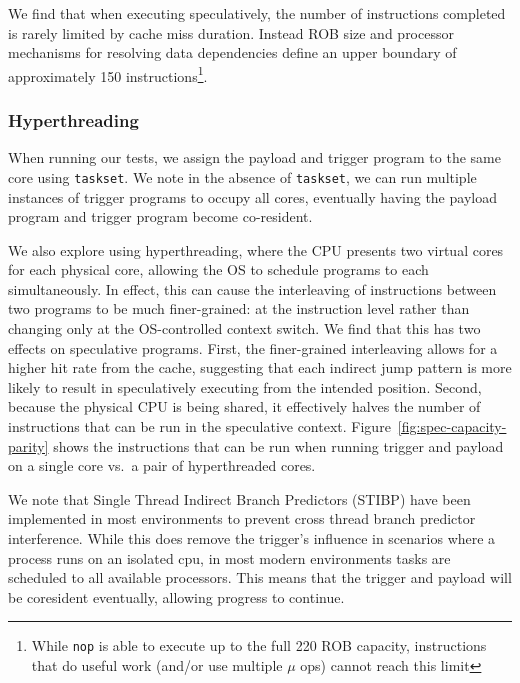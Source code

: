 \medskip

We find that when executing speculatively, the number of instructions completed
is rarely limited by cache miss duration. Instead
ROB size and processor mechanisms for resolving
data dependencies define an upper boundary of approximately 150
instructions\footnote{While \texttt{nop} is able to execute up to the full 220
ROB capacity, instructions that do useful work (and/or use multiple $\mu$ ops) cannot reach this limit}.



\subsubsection{Hyperthreading}
\label{sssec:hyperthread}

\FigSpecMeasureParity

When running our tests, we assign the payload and trigger program to the same
core using \texttt{taskset}. We note in the absence of \texttt{taskset}, we can
run multiple instances of trigger programs to occupy all cores, eventually
having the payload program and trigger program become co-resident.

We also explore using hyperthreading, where the CPU presents two virtual cores
for each physical core, allowing the OS to schedule programs to each
simultaneously. In effect, this can cause the interleaving of instructions
between two programs to be much finer-grained: at the instruction level rather
than changing only at the OS-controlled context switch. We find that this
has two effects on speculative programs. First, the finer-grained interleaving
allows for a higher hit rate from the cache, suggesting that each indirect jump
pattern is more likely to result in speculatively executing from the intended
position. %
Second, because the physical CPU is being shared, it effectively halves the
number of instructions that can be run in the speculative context.
Figure~\ref{fig:spec-capacity-parity} shows the instructions that can be run when
running trigger and payload on a single core vs.\ a pair of hyperthreaded cores.

We note that Single Thread Indirect Branch Predictors (STIBP) have been implemented
in most environments to prevent cross thread branch predictor interference.
While this does remove the \speculake trigger's influence in scenarios where a
process runs on an isolated cpu, in most modern environments
tasks are scheduled to all available processors. This means that the trigger and
payload will be coresident eventually, allowing progress to continue.


